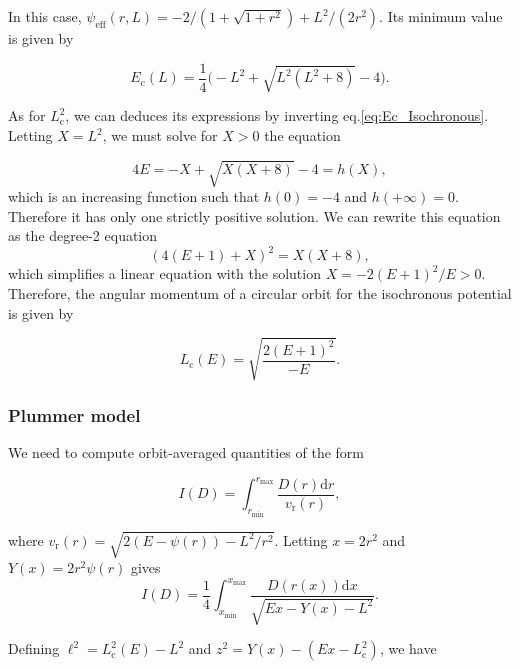 \documentclass[11pt]{article}
\newcommand{\rr}{\mathrm{r}}
\newcommand{\vr}{v_{\rr}}
\newcommand{\rd}{{\mathrm{d}}}
\newcommand{\rmax}{r_{\max}}
\newcommand{\rmin}{r_{\min}}
\newcommand{\psieff}{\psi_{\mathrm{eff}}}
\newcommand{\Ec}{E_{{\mathrm{c}}}}
\newcommand{\Lc}{L_{{\mathrm{c}}}}
\begin{document}
In this case, $\psieff(r,L)=-2/(1+\sqrt{1+r^{2}}) + L^{2}/(2r^{2})$. Its minimum value is given by

\begin{equation}
  \Ec(L) = \frac{1}{4} \bigg(-L^{2} + \sqrt{L^{2}(L^{2}+8)}-4\bigg).
  \label{eq:Ec_Isochronous}
\end{equation}

As for $\Lc^{2}$, we can deduces its expressions by inverting eq.\eqref{eq:Ec_Isochronous}. Letting $X=L^{2}$, we must solve for $X>0$ the equation

\begin{equation}
  4E=-X+\sqrt{X(X+8)}-4 = h(X) ,
  \label{eq:Lc2X}
\end{equation}
which is an increasing function such that $h(0)=-4$ and $h(+\infty)=0$. Therefore it has only one strictly positive solution. We can rewrite this equation as the degree-2 equation
\begin{equation}
  (4(E+1)+X)^{2}=X(X+8) ,
  \label{eq:Lc2X_poly2_equation}
\end{equation}
which simplifies a linear equation with the solution $X=-2(E+1)^{2}/E>0$. Therefore, the angular momentum of a circular orbit for the isochronous potential is given by

\begin{equation}
  \Lc(E) = \sqrt{\frac{2(E+1)^{2}}{-E}} .
  \label{eq:Ec_Iso}
  \end{equation}


\subsubsection{Plummer model}
\label{subsubsec:PlummerOrbitStudy}

We need to compute orbit-averaged quantities of the form

\begin{equation}
  I(D) = \int_{\rmin}^{\rmax}  \frac{D(r)\rd r}{\vr(r)} ,
  \label{eq:I(D)} 
\end{equation}

where $\vr(r)=\sqrt{2(E-\psi(r))-L^{2}/r^{2}}$. Letting $x=2r^{2}$ and $Y(x)=2r^{2}\psi(r)$ gives
\begin{equation}
  I(D) = \frac{1}{4}\int_{x_{\min}}^{x_{\max}}  \frac{D(r(x))\rd x}{\sqrt{E x - Y(x) -L^{2}}} .
  \label{eq:I(D)ChgX}
\end{equation}

Defining $\ell^{2} = \Lc^{2}(E)-L^{2}$ and $z^{2}=Y(x)-(E x - \Lc^{2})$, we have
\end{document}
